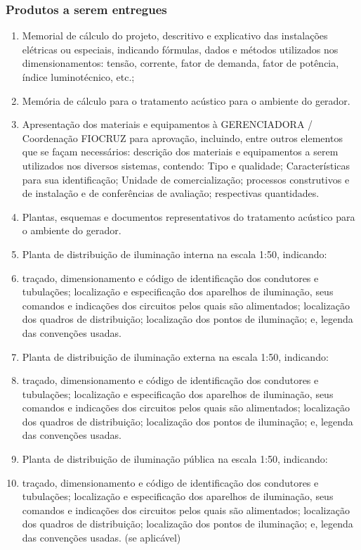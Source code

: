 \subsubsection{Produtos a serem entregues}
	\begin{enumerate}
		\item Memorial de cálculo do projeto, descritivo e explicativo das instalações elétricas ou especiais, indicando fórmulas, dados e métodos utilizados nos dimensionamentos: tensão, corrente, fator de demanda, fator de potência, índice luminotécnico, etc.;
		\item Memória de cálculo para o tratamento acústico para o ambiente do gerador.
		\item Apresentação dos materiais e equipamentos à GERENCIADORA / Coordenação FIOCRUZ para aprovação, incluindo, entre outros elementos que se façam necessários: descrição dos materiais e equipamentos a serem utilizados nos diversos sistemas, contendo: Tipo e qualidade; Características para sua identificação; Unidade de comercialização; processos construtivos e de instalação e de conferências de avaliação; respectivas quantidades.
		\item Plantas, esquemas e documentos representativos do tratamento acústico para o ambiente do gerador.
		\item Planta de distribuição de iluminação interna na escala 1:50,  indicando: 
		\item traçado, dimensionamento e código de identificação dos condutores e tubulações; localização e especificação dos aparelhos de iluminação, seus comandos e indicações dos circuitos pelos quais são alimentados; localização dos quadros de distribuição; localização dos pontos de iluminação; e, legenda das convenções usadas.
		\item Planta de distribuição de iluminação externa na escala 1:50,  indicando: 
		\item traçado, dimensionamento e código de identificação dos condutores e tubulações; localização e especificação dos aparelhos de iluminação, seus comandos e indicações dos circuitos pelos quais são alimentados; localização dos quadros de distribuição; localização dos pontos de iluminação; e, legenda das convenções usadas.
		\item Planta de distribuição de iluminação pública na escala 1:50,  indicando: 
		\item traçado, dimensionamento e código de identificação dos condutores e tubulações; localização e especificação dos aparelhos de iluminação, seus comandos e indicações dos circuitos pelos quais são alimentados; localização dos quadros de distribuição; localização dos pontos de iluminação; e, legenda das convenções usadas. (se aplicável)

\end{enumerate}
